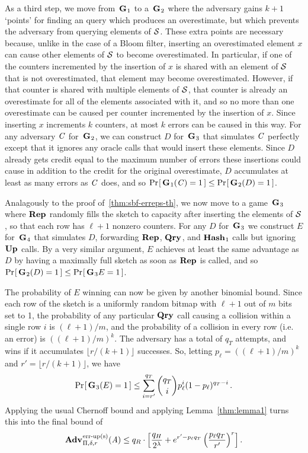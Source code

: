 As a third step, we move from~$\textup{\textbf{G}}\hspace{0.5pt}_1$ to a~$\textup{\textbf{G}}\hspace{0.5pt}_2$ where the adversary gains
$k+1$ `points' for finding an query which produces an
overestimate, but which prevents the adversary from querying elements of $\mathcal{S}$.
These extra points are necessary because, unlike in the case of a Bloom
filter, inserting an overestimated element $x$ can cause other elements of
$\mathcal{S}$ to become overestimated. In particular, if one of the counters
incremented by the insertion of $x$ is shared with an element of $\mathcal{S}$ that is
not overestimated, that element may become overestimated. However, if that
counter is shared with multiple elements of $\mathcal{S}$, that counter is already an
overestimate for all of the elements associated with it, and so no more than one
overestimate can be caused per counter incremented by the insertion of $x$.
Since inserting $x$ increments $k$ counters, at most $k$ errors can be caused in
this way. For any adversary $\mathit{C}$ for~$\textup{\textbf{G}}\hspace{0.5pt}_2$, we can construct $D$
for~$\textup{\textbf{G}}\hspace{0.5pt}_3$ that simulates $\mathit{C}$ perfectly except that it ignores any oracle
calls that would insert these elements. Since $D$ already gets credit equal to
the maximum number of errors these insertions could cause in addition to the
credit for the original overestimate, $D$ accumulates at least as many errors as
$\mathit{C}$ does, and so $\Pr\hspace{-1pt}\left[\,\textup{\textbf{G}}\hspace{0.5pt}_1(\mathit{C}) = 1\,\right] \le \Pr\hspace{-1pt}\left[\,\textup{\textbf{G}}\hspace{0.5pt}_2(D) = 1\,\right]$.

Analagously to the proof of~\ref{thm:sbf-erreps-th}, we now move to a
game~$\textup{\textbf{G}}\hspace{0.5pt}_3$ where $\textup{\textbf{Rep}}\hspace{0.5pt}$ randomly fills the sketch to capacity after
inserting the elements of $\mathcal{S}$, so that each row has $\ell+1$ nonzero
counters. For any $D$ for~$\textup{\textbf{G}}\hspace{0.5pt}_3$ we construct $E$ for~$\textup{\textbf{G}}\hspace{0.5pt}_4$ that
simulates $D$, forwarding $\textup{\textbf{Rep}}\hspace{0.5pt}$, $\textup{\textbf{Qry}}\hspace{0.5pt}$, and $\textup{\textbf{Hash}}\hspace{0.5pt}_1$ calls but ignoring
$\textup{\textbf{Up}}\hspace{0.5pt}$ calls. By a very similar argument, $E$ achieves at least the same
advantage as $D$ by having a maximally full sketch as soon as $\textup{\textbf{Rep}}\hspace{0.5pt}$ is called,
and so $\Pr\hspace{-1pt}\left[\,\textup{\textbf{G}}\hspace{0.5pt}_2(D) = 1\,\right] \le \Pr\hspace{-1pt}\left[\,\textup{\textbf{G}}\hspace{0.5pt}_3{E} = 1\,\right]$.

The probability of $E$ winning can now be given by another binomial bound. Since
each row of the sketch is a uniformly random bitmap with $\ell+1$ out of $m$
bits set to 1, the probability of any particular $\textup{\textbf{Qry}}\hspace{0.5pt}$ call causing a
collision within a single row $i$ is $(\ell+1)/m$, and the probability of a
collision in every row (i.e. an error) is $((\ell+1)/m)^k$. The adversary has a
total of $q_T$ attempts, and wins if it accumulates $\lfloor r/(k+1) \rfloor$
successes. So, letting $p_\ell = ((\ell+1)/m)^k$ and
$r' = \lfloor r/(k+1) \rfloor$, we have
\begin{equation}
   \Pr\hspace{-1pt}\left[\,\textup{\textbf{G}}\hspace{0.5pt}_3(E)=1\,\right] \le
     \sum_{i=r'}^{q_T} \binom{q_T}{i}p_\ell^i(1-p_\ell)^{q_T-i} \,.
\end{equation}
Applying the usual Chernoff bound and applying Lemma~\ref{thm:lemma1} turns this
into the final bound of
\begin{equation}
   \Adv{\erreps}_{\Pi,\delta,r}(\advA) \leq
     q_R \cdot \left[\frac{q_H}{2^\lambda} + e^{r'-p_\ell q_T}\left(\frac{p_\ell q_T}{r'}\right)^r\right].
\end{equation}